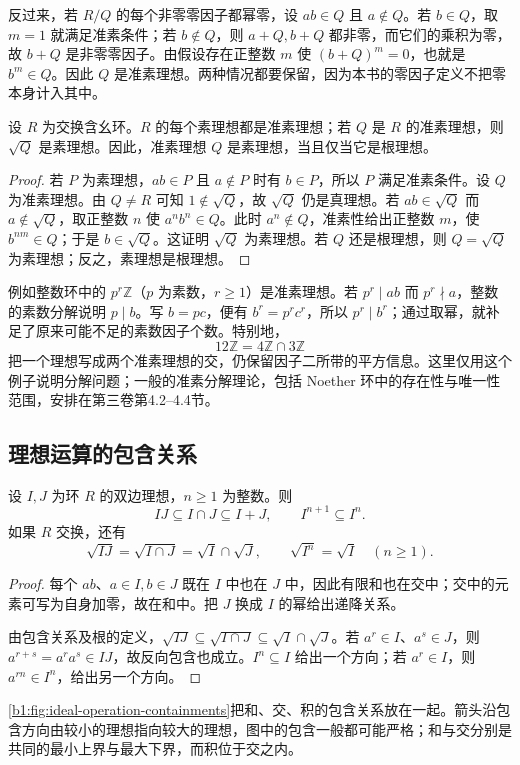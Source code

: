 \ProseParagraphBreak
反过来，若 \(R/Q\) 的每个非零零因子都幂零，设 \(ab\in Q\) 且 \(a\notin Q\)。若 \(b\in Q\)，取 \(m=1\) 就满足准素条件；若 \(b\notin Q\)，则 \(a+Q,b+Q\) 都非零，而它们的乘积为零，故 \(b+Q\) 是非零零因子。由假设存在正整数 \(m\) 使 \((b+Q)^m=0\)，也就是 \(b^m\in Q\)。因此 \(Q\) 是准素理想。两种情况都要保留，因为本书的零因子定义不把零本身计入其中。

\begin{proposition}\label{b1:prop:primary-radical}
	设 \(R\) 为交换含幺环。\(R\) 的每个素理想都是准素理想；若 \(Q\) 是 \(R\) 的准素理想，则 \(\sqrt Q\) 是素理想。因此，准素理想 \(Q\) 是素理想，当且仅当它是根理想。
\end{proposition}
\begin{proof}
	若 \(P\) 为素理想，\(ab\in P\) 且 \(a\notin P\) 时有 \(b\in P\)，所以 \(P\) 满足准素条件。设 \(Q\) 为准素理想。由 \(Q\neq R\) 可知 \(1\notin\sqrt Q\)，故 \(\sqrt Q\) 仍是真理想。若 \(ab\in\sqrt Q\) 而 \(a\notin\sqrt Q\)，取正整数 \(n\) 使 \(a^nb^n\in Q\)。此时 \(a^n\notin Q\)，准素性给出正整数 \(m\)，使 \(b^{nm}\in Q\)；于是 \(b\in\sqrt Q\)。这证明 \(\sqrt Q\) 为素理想。若 \(Q\) 还是根理想，则 \(Q=\sqrt Q\) 为素理想；反之，素理想是根理想。
\end{proof}
例如整数环中的 \(p^r\mathbb Z\)（\(p\) 为素数，\(r\geq1\)）是准素理想。若 \(p^r\mid ab\) 而 \(p^r\nmid a\)，整数的素数分解说明 \(p\mid b\)。写 \(b=pc\)，便有 \(b^r=p^rc^r\)，所以 \(p^r\mid b^r\)；通过取幂，就补足了原来可能不足的素数因子个数。特别地，
\[
	12\mathbb Z=4\mathbb Z\cap3\mathbb Z
\]
把一个理想写成两个准素理想的交，仍保留因子二所带的平方信息。这里仅用这个例子说明分解问题；一般的准素分解理论，包括 Noether 环中的存在性与唯一性范围，安排在第三卷第4.2--4.4节。

\subsection{理想运算的包含关系}
\label{b1:subsec:1003:03}
\begin{proposition}\label{b1:prop:ideal-containments}
	设 \(I,J\) 为环 \(R\) 的双边理想，\(n\geq1\) 为整数。则
	\[
		IJ\subseteq I\cap J\subseteq I+J,\qquad I^{n+1}\subseteq I^n.
	\]
	如果 \(R\) 交换，还有
	\[
		\sqrt{IJ}=\sqrt{I\cap J}=\sqrt I\cap\sqrt J, \qquad \sqrt{I^n}=\sqrt I\quad(n\geq1).
	\]
\end{proposition}
\begin{proof}
	每个 \(ab\)、\(a\in I,b\in J\) 既在 \(I\) 中也在 \(J\) 中，因此有限和也在交中；交中的元素可写为自身加零，故在和中。把 \(J\) 换成 \(I\) 的幂给出递降关系。

	由包含关系及根的定义，\(\sqrt{IJ}\subseteq\sqrt{I\cap J}\subseteq\sqrt I\cap\sqrt J\)。若 \(a^r\in I\)、\(a^s\in J\)，则 \(a^{r+s}=a^ra^s\in IJ\)，故反向包含也成立。\(I^n\subseteq I\) 给出一个方向；若 \(a^r\in I\)，则 \(a^{rn}\in I^n\)，给出另一个方向。
\end{proof}
\cref{b1:fig:ideal-operation-containments}把和、交、积的包含关系放在一起。箭头沿包含方向由较小的理想指向较大的理想，图中的包含一般都可能严格；和与交分别是共同的最小上界与最大下界，而积位于交之内。

